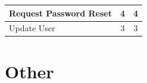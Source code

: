 \documentclass[11pt,a4paper]{article}
\begin{document}
\begin{table}[H]
\begin{tabular}{|l|c|c|}
Request Password Reset                   & 4                                                                                                 & 4                                                                                                  \\ \hline
Update User                              & 3                                                                                                 & 3                                                                                                  \\ \hline
\end{tabular}
\end{table}

\section{Other}
\end{document}

